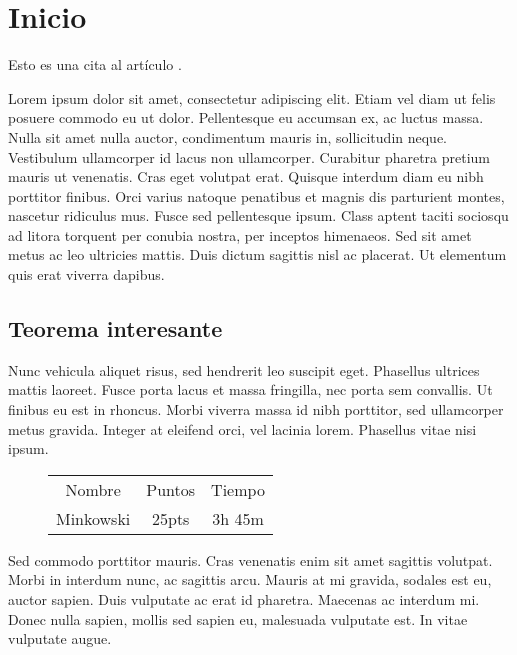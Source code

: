 \documentclass[../preambulo.tex]{subfiles}
\begin{document}
\section{Inicio}
\label{Sec:inicio}	%

Esto es una cita al artículo \cite{Ikemachi}.

Lorem ipsum dolor sit amet, consectetur adipiscing elit. Etiam vel diam ut felis posuere commodo eu ut dolor. Pellentesque eu accumsan ex, ac luctus massa. Nulla sit amet nulla auctor, condimentum mauris in, sollicitudin neque. Vestibulum ullamcorper id lacus non ullamcorper. Curabitur pharetra pretium mauris ut venenatis. Cras eget volutpat erat. Quisque interdum diam eu nibh porttitor finibus. Orci varius natoque penatibus et magnis dis parturient montes, nascetur ridiculus mus. Fusce sed pellentesque ipsum. Class aptent taciti sociosqu ad litora torquent per conubia nostra, per inceptos himenaeos. Sed sit amet metus ac leo ultricies mattis. Duis dictum sagittis nisl ac placerat. Ut elementum quis erat viverra dapibus.



\subsection{Teorema interesante}


Nunc vehicula aliquet risus, sed hendrerit leo suscipit eget. Phasellus ultrices mattis laoreet. Fusce porta lacus et massa fringilla, nec porta sem convallis. Ut finibus eu est in rhoncus. Morbi viverra massa id nibh porttitor, sed ullamcorper metus gravida. Integer at eleifend orci, vel lacinia lorem. Phasellus vitae nisi ipsum.


\begin{figure}[H]
	\centering
	\begin{tabular}{ccc}
	Nombre & Puntos & Tiempo \\ 
	Minkowski & 25pts & 3h 45m 
	\end{tabular}
\end{figure}


Sed commodo porttitor mauris. Cras venenatis enim sit amet sagittis volutpat. Morbi in interdum nunc, ac sagittis arcu. Mauris at mi gravida, sodales est eu, auctor sapien. Duis vulputate ac erat id pharetra. Maecenas ac interdum mi. Donec nulla sapien, mollis sed sapien eu, malesuada vulputate est. In vitae vulputate augue.
\end{document}
